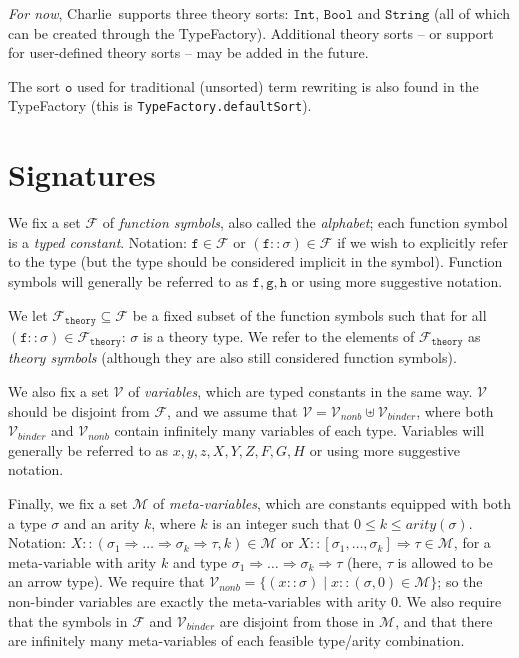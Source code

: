 \documentclass{lmcs}
\theoremstyle{theorem}\newtheorem{theorem}{Theorem}
\theoremstyle{theorem}\newtheorem{lemma}[theorem]{Lemma}
\theoremstyle{theorem}\newtheorem{corollary}[theorem]{Corollary}
\theoremstyle{definition}\newtheorem{definition}[theorem]{Definition}
\theoremstyle{definition}\newtheorem{example}[theorem]{Example}
\newcommand{\F}{\mathcal{F}}
\newcommand{\thF}{\mathcal{F}_{\mathtt{theory}}}
\newcommand{\V}{\mathcal{V}}
\newcommand{\M}{\mathcal{M}}
\newcommand{\Vfree}{\mathcal{V}_{\mathit{nonb}}}
\newcommand{\Vbound}{\mathcal{V}_{\mathit{binder}}}
\newcommand{\atype}{\sigma}
\newcommand{\btype}{\tau}
\newcommand{\identifier}[1]{\mathtt{#1}}
\newcommand{\afun}{\identifier{f}}
\newcommand{\bfun}{\identifier{g}}
\newcommand{\cfun}{\identifier{h}}
\newcommand{\avar}{x}
\newcommand{\bvar}{y}
\newcommand{\cvar}{z}
\newcommand{\Avar}{X}
\newcommand{\Bvar}{Y}
\newcommand{\Cvar}{Z}
\newcommand{\AFvar}{F}
\newcommand{\BFvar}{G}
\newcommand{\CFvar}{H}
\newcommand{\arity}{\mathit{arity}}
\newcommand{\arrtype}{\Rightarrow}
\newcommand{\symb}[1]{\mathtt{#1}}
\newcommand{\bool}{\symb{Bool}}
\newcommand{\tint}{\symb{Int}}
\newcommand{\tstring}{\symb{String}}
\newcommand{\unitsort}{\mathtt{o}}
\newcommand{\charlie}{\textsf{Charlie}\xspace}
\begin{document}
\emph{For now}, \charlie\ supports three theory sorts: $\tint$, $\bool$ and
$\tstring$ (all of which can be created through the TypeFactory).  Additional
theory sorts -- or support for user-defined theory sorts -- may be added in the
future.

The sort $\unitsort$ used for traditional (unsorted) term rewriting is also
found in the TypeFactory (this is \texttt{TypeFactory.defaultSort}).

\section{Signatures}

We fix a set $\F$ of \emph{function symbols}, also called the \emph{alphabet};
each function symbol is a \emph{typed constant}. Notation: $\afun \in \F$ or
$(\afun :: \atype) \in \F$ if we wish to explicitly refer to the type (but the
type should be considered implicit in the symbol).
Function symbols will generally be referred to as $\afun,\bfun,\cfun$ or using
more suggestive notation.

We let $\thF \subseteq \F$ be a fixed subset of the function symbols such that
for all $(\afun :: \atype) \in \thF$: $\atype$ is a theory type.  We refer to
the elements of $\thF$ as \emph{theory symbols} (although they are also still
considered function symbols).

We also fix a set $\V$ of \emph{variables}, which are typed constants in the
same way.  $\V$ should be disjoint from $\F$, and we assume that $\V = \Vfree
\uplus \Vbound$, where both $\Vbound$ and $\Vfree$ contain infinitely many
variables of each type.
Variables will generally be referred to as $\avar,\bvar,\cvar,\Avar,\Bvar,\Cvar,
\AFvar,\BFvar,\CFvar$ or using more suggestive notation.

Finally, we fix a set $\M$ of \emph{meta-variables}, which are constants
equipped with both a type $\atype$ and an arity $k$, where $k$ is an integer
such that $0 \leq k \leq \arity(\atype)$.  Notation:
$X :: (\atype_1 \arrtype \dots \arrtype \atype_k \arrtype \btype,k) \in \M$ or
$X :: [\atype_1,\dots,\atype_k] \arrtype \btype \in \M$, for a meta-variable
with arity $k$ and type $\atype_1 \arrtype \dots \arrtype \atype_k \arrtype
\btype$ (here, $\btype$ is allowed to be an arrow type).
We require that $\Vfree = \{ (x :: \atype) \mid x :: (\atype,0) \in \M \}$; so
the non-binder variables are exactly the meta-variables with arity
$0$.  We also require that the symbols in $\F$ and $\Vbound$ are disjoint from
those in $\M$, and that there are infinitely many meta-variables of each
feasible type/arity combination.
\end{document}
